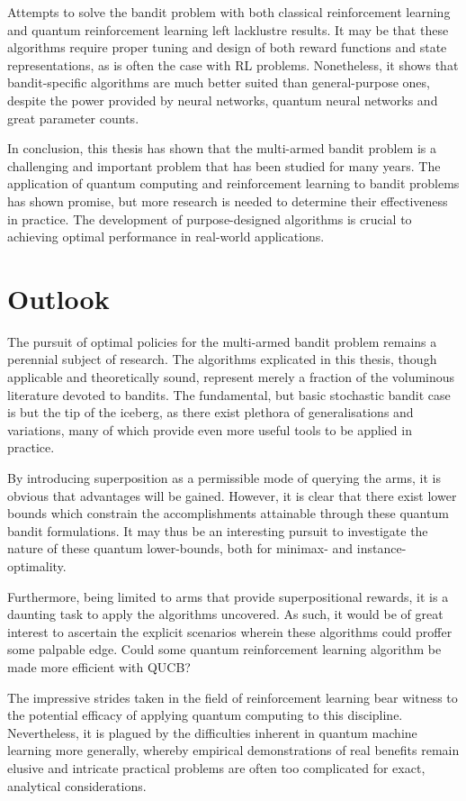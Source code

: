 Attempts to solve the bandit problem with both classical reinforcement learning and quantum reinforcement learning left lacklustre results.
It may be that these algorithms require proper tuning and design of both reward functions and state representations, as is often the case with RL problems.
Nonetheless, it shows that bandit-specific algorithms are much better suited than general-purpose ones, despite the power provided by neural networks, quantum neural networks and great parameter counts.

In conclusion, this thesis has shown that the multi-armed bandit problem is a challenging and important problem that has been studied for many years.
The application of quantum computing and reinforcement learning to bandit problems has shown promise, but more research is needed to determine their effectiveness in practice.
The development of purpose-designed algorithms is crucial to achieving optimal performance in real-world applications.

\section{Outlook}
The pursuit of optimal policies for the multi-armed bandit problem remains a perennial subject of research.
The algorithms explicated in this thesis, though applicable and theoretically sound, represent merely a fraction of the voluminous literature devoted to bandits.
The fundamental, but basic stochastic bandit case is but the tip of the iceberg, as there exist plethora of generalisations and variations, many of which provide even more useful tools to be applied in practice.

By introducing superposition as a permissible mode of querying the arms, it is obvious that advantages will be gained.
However, it is clear that there exist lower bounds which constrain the accomplishments attainable through these quantum bandit formulations.
It may thus be an interesting pursuit to investigate the nature of these quantum lower-bounds, both for minimax- and instance-optimality.

Furthermore, being limited to arms that provide superpositional rewards, it is a daunting task to apply the algorithms uncovered.
As such, it would be of great interest to ascertain the explicit scenarios wherein these algorithms could proffer some palpable edge.
Could some quantum reinforcement learning algorithm be made more efficient with QUCB?

The impressive strides taken in the field of reinforcement learning bear witness to the potential efficacy of applying quantum computing to this discipline.
Nevertheless, it is plagued by the difficulties inherent in quantum machine learning more generally, whereby empirical demonstrations of real benefits remain elusive and intricate practical problems are often too complicated for exact, analytical considerations.

